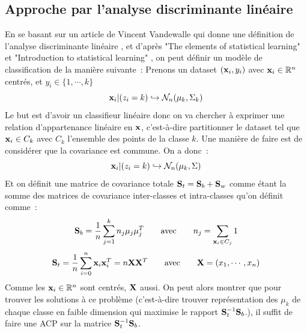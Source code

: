 \documentclass[12pt]{article}
\begin{document}
\subsection{Approche par l'analyse discriminante linéaire}\label{LDA_1}
En se basant sur un article de Vincent Vandewalle qui donne une définition de l'analyse discriminante linéaire \cite{VV_clustering}, et d'après "The elements of statistical learning" et "Introduction to statistical learning" \cite{elmstatlearn}, on peut définir un modèle de classification de la manière suivante~: Prenons un dataset ${({\bf x}_i, y_i)}$ avec ${\bf x}_i \in \mathbb{R}^n$ centrés, et $y_i \in \{1, \cdots, k\}$
$$
{\bf x}_i | (z_i = k) \hookrightarrow \mathcal{N}_n(\mu_k, \Sigma_k)
$$
Le but est d'avoir un classifieur linéaire donc on va chercher à exprimer une relation d'appartenance linéaire en ${\bf x}$, c'est-à-dire partitionner le dataset tel que ${\bf x}_i \in C_k$ avec $C_k$ l'ensemble des points de la classe $k$. Une manière de faire \cite{elmstatlearn} est de considérer que la covariance est commune. On a donc~: 
$$
{\bf x}_i | (z_i = k) \hookrightarrow \mathcal{N}_n(\mu_k, \Sigma)
$$
Et on définit une matrice de covariance totale ${\bf S}_t = {\bf S}_b + {\bf S}_w$ comme étant la somme des matrices de covariance inter-classes et intra-classes qu'on définit comme~:
$$
{\bf S}_b = \frac{1}{n} \sum_{j=1}^{k}n_j\mu_j\mu^T_j \quad \quad \text{avec} \quad \quad n_j = \sum_{{\bf x}_i \in C_j} 1
$$
$$
{\bf S}_t = \frac{1}{n} \sum_{i = 0}^{n} {\bf x}_i{\bf x}^T_i = n{\bf X}{\bf X}^T \quad \quad \text{avec} \quad \quad {\bf X} = (x_1, \cdots, x_n)
$$
Comme les ${\bf x}_i \in \mathbb{R}^n$ sont centrés, $\bf X$ aussi.
On peut alors montrer \cite{LDA-proof} que pour trouver les solutions à ce problème (c'est-à-dire trouver représentation des $\mu_k$ de chaque classe en faible dimension qui maximise le rapport ${\bf S}^{-1}_t{\bf S}_b$.), il suffit de faire une ACP sur la matrice ${\bf S}^{-1}_t{\bf S}_b$.
\end{document}
